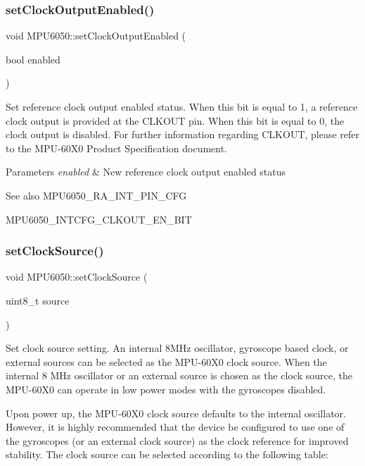 \subsubsection{\texorpdfstring{setClockOutputEnabled()}{setClockOutputEnabled()}}
{\footnotesize\ttfamily void M\+P\+U6050\+::set\+Clock\+Output\+Enabled (\begin{DoxyParamCaption}\item[{bool}]{enabled }\end{DoxyParamCaption})}

Set reference clock output enabled status. When this bit is equal to 1, a reference clock output is provided at the C\+L\+K\+O\+UT pin. When this bit is equal to 0, the clock output is disabled. For further information regarding C\+L\+K\+O\+UT, please refer to the M\+P\+U-\/60\+X0 Product Specification document. 
\begin{DoxyParams}{Parameters}
{\em enabled} & New reference clock output enabled status \\
\hline
\end{DoxyParams}
\begin{DoxySeeAlso}{See also}
M\+P\+U6050\+\_\+\+R\+A\+\_\+\+I\+N\+T\+\_\+\+P\+I\+N\+\_\+\+C\+FG 

M\+P\+U6050\+\_\+\+I\+N\+T\+C\+F\+G\+\_\+\+C\+L\+K\+O\+U\+T\+\_\+\+E\+N\+\_\+\+B\+IT 
\end{DoxySeeAlso}
\mbox{\label{class_m_p_u6050_a4c1cd147d038e024bdeaa053c4d77734}} 
\subsubsection{\texorpdfstring{setClockSource()}{setClockSource()}}
{\footnotesize\ttfamily void M\+P\+U6050\+::set\+Clock\+Source (\begin{DoxyParamCaption}\item[{uint8\+\_\+t}]{source }\end{DoxyParamCaption})}

Set clock source setting. An internal 8M\+Hz oscillator, gyroscope based clock, or external sources can be selected as the M\+P\+U-\/60\+X0 clock source. When the internal 8 M\+Hz oscillator or an external source is chosen as the clock source, the M\+P\+U-\/60\+X0 can operate in low power modes with the gyroscopes disabled.

Upon power up, the M\+P\+U-\/60\+X0 clock source defaults to the internal oscillator. However, it is highly recommended that the device be configured to use one of the gyroscopes (or an external clock source) as the clock reference for improved stability. The clock source can be selected according to the following table\+:



